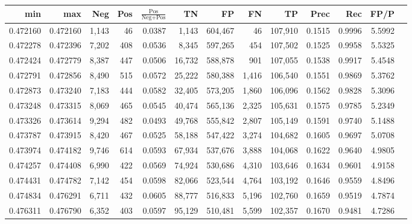 \begin{tabular}{rrrrrrrrrrrrr}
\toprule
     min &      max &   Neg &   Pos & $\frac{\text{Pos}}{\text{Neg}+\text{Pos}}$ &      TN &      FP &      FN &      TP &   Prec &    Rec &   FP/P \\
\midrule
0.472160 & 0.472160 & 1,143 &    46 &                                     0.0387 &   1,143 & 604,467 &      46 & 107,910 & 0.1515 & 0.9996 & 5.5992 \\
0.472278 & 0.472396 & 7,202 &   408 &                                     0.0536 &   8,345 & 597,265 &     454 & 107,502 & 0.1525 & 0.9958 & 5.5325 \\
0.472424 & 0.472779 & 8,387 &   447 &                                     0.0506 &  16,732 & 588,878 &     901 & 107,055 & 0.1538 & 0.9917 & 5.4548 \\
0.472791 & 0.472856 & 8,490 &   515 &                                     0.0572 &  25,222 & 580,388 &   1,416 & 106,540 & 0.1551 & 0.9869 & 5.3762 \\
0.472873 & 0.473240 & 7,183 &   444 &                                     0.0582 &  32,405 & 573,205 &   1,860 & 106,096 & 0.1562 & 0.9828 & 5.3096 \\
0.473248 & 0.473315 & 8,069 &   465 &                                     0.0545 &  40,474 & 565,136 &   2,325 & 105,631 & 0.1575 & 0.9785 & 5.2349 \\
0.473326 & 0.473614 & 9,294 &   482 &                                     0.0493 &  49,768 & 555,842 &   2,807 & 105,149 & 0.1591 & 0.9740 & 5.1488 \\
0.473787 & 0.473915 & 8,420 &   467 &                                     0.0525 &  58,188 & 547,422 &   3,274 & 104,682 & 0.1605 & 0.9697 & 5.0708 \\
0.473974 & 0.474182 & 9,746 &   614 &                                     0.0593 &  67,934 & 537,676 &   3,888 & 104,068 & 0.1622 & 0.9640 & 4.9805 \\
0.474257 & 0.474408 & 6,990 &   422 &                                     0.0569 &  74,924 & 530,686 &   4,310 & 103,646 & 0.1634 & 0.9601 & 4.9158 \\
0.474431 & 0.474782 & 7,142 &   454 &                                     0.0598 &  82,066 & 523,544 &   4,764 & 103,192 & 0.1646 & 0.9559 & 4.8496 \\
0.474834 & 0.476291 & 6,711 &   432 &                                     0.0605 &  88,777 & 516,833 &   5,196 & 102,760 & 0.1659 & 0.9519 & 4.7874 \\
0.476311 & 0.476790 & 6,352 &   403 &                                     0.0597 &  95,129 & 510,481 &   5,599 & 102,357 & 0.1670 & 0.9481 & 4.7286 \\

\end{tabular}
